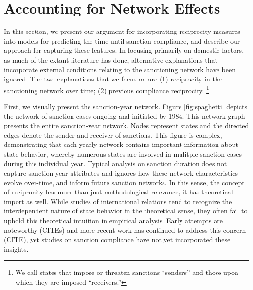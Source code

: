 \section*{Accounting for Network Effects}
\label{neteffects}

In this section, we present our argument for incorporating reciprocity measures into models for predicting the time until sanction compliance, and describe our approach for capturing these features. In focusing primarily on domestic factors, as much of the extant literature has done, alternative explanations that incorporate external conditions relating to the sanctioning network have been ignored. The two explanations that we focus on are (1) reciprocity in the sanctioning network over time; (2) previous compliance reciprocity. \footnote{We call states that impose or threaten sanctions “senders” and those upon which they are imposed “receivers.”}

First, we visually present the sanction-year network. Figure \ref{fig:spaghetti} depicts the network of sanction cases ongoing and initiated by 1984. This network graph presents the entire sanction-year network.  Nodes represent states and the directed edges denote the sender and receiver of sanctions. This figure is complex, demonstrating that each yearly network contains important information about state behavior, whereby numerous states are involved in mulitple sanction cases during this individual year. Typical analysis on sanction duration does not capture sanction-year attributes and ignores how these network characteristics evolve over-time, and inform future sanction networks. In this sense, the concept of reciprocity has more than just methodological relevance, it has theoretical import as well. While studies of international relations tend to recognize the interdependent nature of state behavior in the theoretical sense, they often fail to uphold this theoretical intuition in empirical analysis. Early attempts are noteworthy (CITEs) and more recent work has continued to address this concern (CITE), yet studies on sanction compliance have not yet incorporated these insights. 

